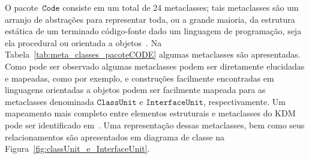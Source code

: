 
O pacote~$\mathtt{Code}$ consiste em um total de 24 metaclasses; tais metaclasses são um arranjo de abstrações para representar toda, ou a grande maioria, da estrutura estática de um terminado código-fonte dado um linguagem de programação, seja ela procedural ou orientada a objetos~\cite{KDM:specification}. Na Tabela~\ref{tab:meta_classes_pacoteCODE} algumas metaclasses são apresentadas. Como pode ser observado algumas metaclasses podem ser diretamente elucidadas e mapeadas, como por exemplo,  e  construções facilmente encontradas em linguagens orientadas a objetos podem ser facilmente mapeada para as metaclasses denominada $\mathtt{ClassUnit}$ e $\mathtt{InterfaceUnit}$, respectivamente. Um mapeamento mais completo entre elementos estruturais e metaclasses do KDM pode ser identificado em~. Uma representação dessas metaclasses, bem como seus relacionamentos são apresentados em diagrama de classe na Figura~\ref{fig:classUnit_e_InterfaceUnit}. 


